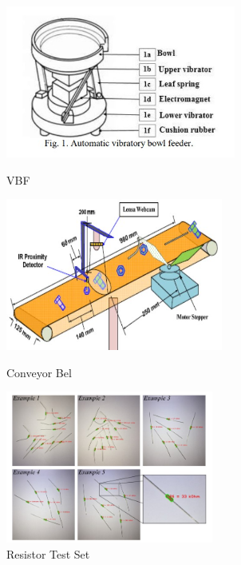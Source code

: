 \begin{figure}[H]
  \begin{minipage}[t]{0.33\textwidth}
    \centering
    \includegraphics[width=\textwidth,height=5cm, keepaspectratio]{imgs/articles/feeder.jpg}
    \caption{VBF \cite{nam2019design}}
    \label{fig:feeder}
  \end{minipage}
  \hfill
  \begin{minipage}[t]{0.33\textwidth}
      \centering
      \includegraphics[width=\textwidth,height=5cm, keepaspectratio]{imgs/articles/conveyor.jpg}
      \caption{Conveyor Bel \cite{Dhenge2013MechanicalNS}}
      \label{fig:conveyor}
      \end{minipage}
  \hfill
  \begin{minipage}[t]{0.33\textwidth}
    \centering
    \includegraphics[width=\textwidth,height=5cm, keepaspectratio]{imgs/articles/resistordata.jpg}
    \caption{Resistor Test Set \cite{8939034}}
    \label{fig:resistordata}
  \end{minipage}
\end{figure}

